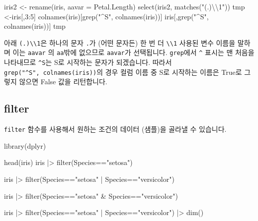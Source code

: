 \documentclass[
  a4paper,
]{book}
\newenvironment{Shaded}{\begin{snugshade}}{\end{snugshade}}
\newcommand{\AttributeTok}[1]{\textcolor[rgb]{0.40,0.45,0.13}{#1}}
\newcommand{\DecValTok}[1]{\textcolor[rgb]{0.68,0.00,0.00}{#1}}
\newcommand{\FunctionTok}[1]{\textcolor[rgb]{0.28,0.35,0.67}{#1}}
\newcommand{\NormalTok}[1]{\textcolor[rgb]{0.00,0.23,0.31}{#1}}
\newcommand{\OtherTok}[1]{\textcolor[rgb]{0.00,0.23,0.31}{#1}}
\newcommand{\SpecialCharTok}[1]{\textcolor[rgb]{0.37,0.37,0.37}{#1}}
\newcommand{\StringTok}[1]{\textcolor[rgb]{0.13,0.47,0.30}{#1}}
\begin{document}
\begin{Shaded}
\begin{Highlighting}[]
\NormalTok{iris2 }\OtherTok{\textless{}{-}} \FunctionTok{rename}\NormalTok{(iris, }\AttributeTok{aavar =}\NormalTok{ Petal.Length)}
\FunctionTok{select}\NormalTok{(iris2, }\FunctionTok{matches}\NormalTok{(}\StringTok{"(.)}\SpecialCharTok{\textbackslash{}\textbackslash{}}\StringTok{1"}\NormalTok{))}
\NormalTok{tmp }\OtherTok{\textless{}{-}}\NormalTok{iris[,}\DecValTok{3}\SpecialCharTok{:}\DecValTok{5}\NormalTok{]}
\FunctionTok{colnames}\NormalTok{(iris)[}\FunctionTok{grep}\NormalTok{(}\StringTok{"\^{}S"}\NormalTok{, }\FunctionTok{colnames}\NormalTok{(iris))]}
\NormalTok{iris[,}\FunctionTok{grep}\NormalTok{(}\StringTok{"\^{}S"}\NormalTok{, }\FunctionTok{colnames}\NormalTok{(iris))]}
\NormalTok{tmp}
\end{Highlighting}
\end{Shaded}

아래 \texttt{(.)\textbackslash{}\textbackslash{}1}은 하나의 문자
\texttt{.}가 (어떤 문자든) 한 번 더
\texttt{\textbackslash{}\textbackslash{}1} 사용된 변수 이름을 말하며
이는 \texttt{aavar} 의 \texttt{aa}밖에 없으므로 \texttt{aavar}가
선택됩니다. \texttt{grep}에서 \texttt{\^{}} 표시는 맨 처음을 나타내므로
\texttt{\^{}S}는 S로 시작하는 문자가 되겠습니다. 따라서
\texttt{grep("\^{}S",\ colnames(iris))}의 경우 컬럼 이름 중 S로 시작하는
이름은 True로 그렇지 않으면 False 값을 리턴합니다.

\hypertarget{filter}{%
\subsection{filter}\label{filter}}

\texttt{filter} 함수를 사용해서 원하는 조건의 데이터 (샘플)을 골라낼 수
있습니다.

\begin{Shaded}
\begin{Highlighting}[]
\FunctionTok{library}\NormalTok{(dplyr)}

\FunctionTok{head}\NormalTok{(iris)}
\NormalTok{iris }\SpecialCharTok{|\textgreater{}} 
  \FunctionTok{filter}\NormalTok{(Species}\SpecialCharTok{==}\StringTok{"setosa"}\NormalTok{)}

\NormalTok{iris }\SpecialCharTok{|\textgreater{}} 
  \FunctionTok{filter}\NormalTok{(Species}\SpecialCharTok{==}\StringTok{"setosa"} \SpecialCharTok{|}\NormalTok{ Species}\SpecialCharTok{==}\StringTok{"versicolor"}\NormalTok{)}

\NormalTok{iris }\SpecialCharTok{|\textgreater{}} 
  \FunctionTok{filter}\NormalTok{(Species}\SpecialCharTok{==}\StringTok{"setosa"} \SpecialCharTok{\&}\NormalTok{ Species}\SpecialCharTok{==}\StringTok{"versicolor"}\NormalTok{)}

\NormalTok{iris }\SpecialCharTok{|\textgreater{}} 
  \FunctionTok{filter}\NormalTok{(Species}\SpecialCharTok{==}\StringTok{"setosa"} \SpecialCharTok{|}\NormalTok{ Species}\SpecialCharTok{==}\StringTok{"versicolor"}\NormalTok{) }\SpecialCharTok{|\textgreater{}} 
  \FunctionTok{dim}\NormalTok{()}
\end{Highlighting}
\end{Shaded}
\end{document}
